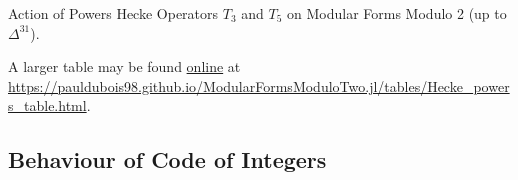 \begin{center}
Action of Powers Hecke Operators $T_3$ and $T_5$ on Modular Forms Modulo 2 (up to $\Delta^{31}$).
\end{center}
A larger table may be found \href{https://pauldubois98.github.io/ModularFormsModuloTwo.jl/tables/Hecke_powers_table.html}{online} at \url{https://pauldubois98.github.io/ModularFormsModuloTwo.jl/tables/Hecke_powers_table.html}.



\subsection{Behaviour of Code of Integers}
